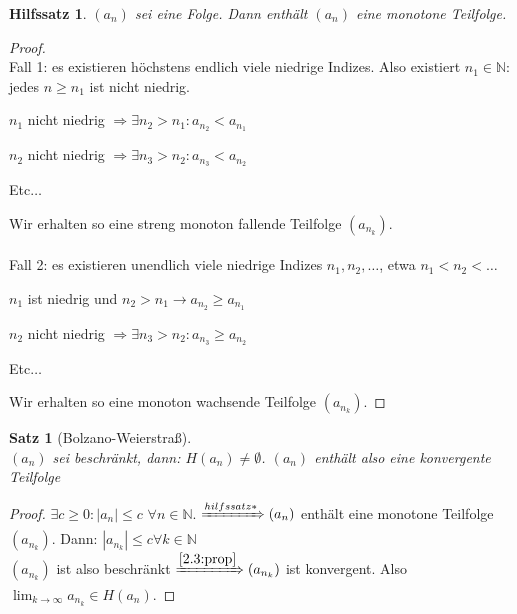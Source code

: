 \documentclass[14pt,titlepage,ngerman,a4paper,headsepline,DIV15,halfparskip*]{scrartcl}
\newcommand{\N}{\mathbb{N}}
\theoremstyle{named}
\theoremstyle{dotless}
\newtheorem{satz}[namedtheorem]{Satz}
\newtheorem*{hilfssatz*}{Hilfssatz}
\begin{document}
\begin{hilfssatz*}
	$(a_{n})$ sei eine Folge. Dann enthält $(a_{n})$ eine monotone Teilfolge.	
\end{hilfssatz*}

\begin{proof} ~\\
	Fall 1: es existieren höchstens endlich viele niedrige Indizes. Also existiert $n_{1} \in \N$: jedes $n \geq n_{1}$ ist nicht niedrig.
	\begin{description}
		\item $n_{1}$ nicht niedrig $\Rightarrow \exists n_{2} > n_{1} : a_{n_{2}} < a_{n_{1}}$
		\item $n_{2}$ nicht niedrig $\Rightarrow \exists n_{3} > n_{2} : a_{n_{3}} < a_{n_{2}}$
		\item Etc$\dotsc$
	\end{description}
	Wir erhalten so eine streng monoton fallende Teilfolge $(a_{n_{k}})$. \\ \\
	Fall 2: es existieren unendlich viele niedrige Indizes $n_{1}, n_{2}, \dotsc$, etwa $n_{1} < n_{2} < \dotsc$
	\begin{description}
		\item $n_{1}$ ist niedrig und $n_{2} > n_{1} \rightarrow a_{n_{2}} \geq a_{n_{1}}$
		\item $n_{2}$ nicht niedrig $\Rightarrow \exists n_{3} > n_{2} : a_{n_{3}} \geq a_{n_{2}}$
		\item Etc$\dotsc$
	\end{description}
	Wir erhalten so eine monoton wachsende Teilfolge $(a_{n_{k}})$.
\end{proof}

\begin{satz}[Bolzano-Weierstra{\ss}] \label{2.12:satz-BolzanoWeierstrass}  ~\\
	$(a_{n})$ sei beschränkt, dann: $H(a_{n}) \neq \emptyset$. $(a_{n})$ enthält also eine konvergente Teilfolge
\end{satz}

\begin{proof}
	$\exists c \geq 0: |a_{n}| \leq c$ $\forall n \in \N$. $\xRightarrow[]{hilfssatz*} (a_{n})$ enthält eine monotone Teilfolge $(a_{n_{k}})$. Dann: $|a_{n_{k}}| \leq c \forall k \in \N$ \\
	$(a_{n_{k}})$ ist also beschränkt $\xRightarrow[]{\ref{2.3:prop}} (a_{n_{k}})$ ist konvergent. Also $\lim_{k \rightarrow \infty} a_{n_{k}} \in H(a_{n})$.
\end{proof}
\end{document}
